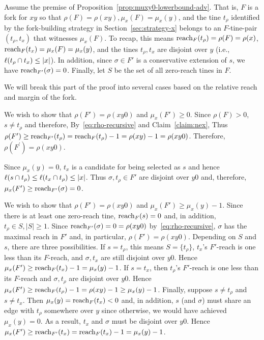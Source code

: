     Assume the premise of Proposition~\ref{prop:muxy0-lowerbound-adv}.
    That is, $F$ is a fork for $xy$ so that 
    $\rho(F) = \rho(xy), \mu_x(F) = \mu_x(y)$, 
    and the tine $t_\rho$ identified by the fork-building strategy in Section~\ref{sec:strategy-x} 
    belongs to an $F$-tine-pair $(t_\rho, t_x)$ that witnesses $\mu_x(F)$. 
    To recap, this means 
    $\operatorname{reach}_F(t_\rho) = \rho(F) = \rho(x)$, 
    $\operatorname{reach}_F(t_x) = \mu_x(F) = \mu_x(y)$,  
    and the tines $t_\rho, t_x$ are disjoint over $y$ 
    (i.e., $\ell(t_\rho \cap t_x) \leq |x|$). 
    In addition, since $\sigma \in F'$ is a conservative extension of $s$, 
    we have $\operatorname{reach}_{F'}(\sigma) = 0$.
    Finally, let $S$ be the set of all zero-reach tines in $F$.
    
    We will break this part of the proof into several cases 
    based on the relative reach and margin of the fork. 

    We wish to show that 
    $\rho(F') = \rho(xy0)$ and 
    $\mu_x(F') \geq 0$. 
    Since $\rho(F) > 0$, $s \neq t_\rho$ and therefore, 
    By~\eqref{eq:rho-recursive} and Claim~\ref{claim:nex}, 
    Thus 
    $\rho(F^\prime) 
    \geq \operatorname{reach}_{F'}(t_\rho) 
    = \operatorname{reach}_F(t_\rho) - 1 
    = \rho(xy) - 1 
    = \rho(xy0)
    $. Therefore, 
    $\rho(F^\prime) = \rho(xy0)$.

    Since $\mu_x(y)=0$, 
    $t_x$ is a candidate for being selected as $s$ and hence 
    $\ell(s \cap t_\rho) \leq \ell(t_x \cap t_\rho) \leq |x|$. 
    Thus $\sigma, t_\rho \in F'$ are disjoint over $y0$ 
    and, therefore, $\mu_x(F') \geq \operatorname{reach}_{F'}(\sigma) = 0$.
    

    We wish to show that 
    $\rho(F') = \rho(xy0)$ and 
    $\mu_x(F') \geq \mu_x(y) - 1$. 
    Since there is at least one zero-reach tine, $\operatorname{reach}_F(s) = 0$ 
    and, in addition, $t_\rho \in S, |S| \geq 1$.
    Since $\operatorname{reach}_{F'}(\sigma) = 0 = \rho(xy0)$ by~\eqref{eq:rho-recursive}, 
    $\sigma$ has the maximal reach in $F'$ and, 
    in particular, $\rho(F') = \rho(xy0)$.
    Depending on $S$ and $s$, there are three possibilities. 
      If $s = t_\rho$, 
      this means $S=\{t_\rho\}$, 
      $t_x$'s $F'$-reach is one less than 
      its $F$-reach, 
      and $\sigma, t_x$ are still disjoint over $y0$.   
      Hence $\mu_x(F') \geq \operatorname{reach}_F(t_x) - 1 = \mu_x(y)-1$.       
      If $s = t_x$, 
      then 
      $t_\rho$'s $F'$-reach is one less than 
      its $F$-reach 
      and $\sigma, t_\rho$ are disjoint over $y0$. 
      Hence $\mu_x(F') \geq \operatorname{reach}_F(t_\rho) - 1 
      = \rho(xy) -1 \geq \mu_x(y)-1$.
      Finally, suppose $s \neq t_\rho$ and $s \neq t_x$. 
      Then $\mu_x(y) = \operatorname{reach}_F(t_x) < 0$ and, in addition, 
      $s$ (and $\sigma$) must share an edge with $t_\rho$ somewhere over $y$ since otherwise, 
      we would have achieved $\mu_x(y)=0$. 
      As a result, $t_x$ and $\sigma$ must be disjoint over $y0$. 
      Hence $\mu_x(F') \geq \operatorname{reach}_{F'}(t_x) = 
      \operatorname{reach}_F(t_x) - 1 = \mu_x(y) - 1$.

